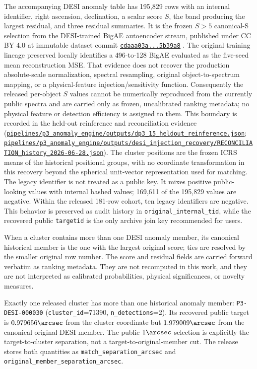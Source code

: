 \documentclass[twocolumn]{aastex701}
\newcommand{\repoBase}{https://github.com/Hubify-Projects/bigbounce/blob/main}
\newcommand{\artifact}[1]{\href{\repoBase/#1}{\nolinkurl{#1}}}
\begin{document}
The accompanying DESI anomaly table has 195,829 rows with an internal identifier, right
ascension, declination, a scalar score $S$, the band producing the largest residual, and three
residual summaries.  It is the frozen $S>5$ canonical-S selection from the DESI-trained BigAE
autoencoder stream, published under CC BY 4.0 at immutable dataset commit
\href{https://huggingface.co/datasets/bamfai/bigbounce-anomaly-catalog/tree/cdaaa03a72c69d86f011be128d93f261dc5b39a8}{\texttt{cdaaa03a...5b39a8}} \citep{Golden2026Data}.  The original
training lineage preserved locally identifies a 496-to-128 BigAE evaluated as the five-seed mean
reconstruction MSE.  That evidence does not recover the production absolute-scale normalization,
spectral resampling, original object-to-spectrum mapping, or a physical-feature injection/sensitivity
function.  Consequently the released per-object $S$ values cannot be numerically reproduced from
the currently public spectra and are carried only as frozen, uncalibrated ranking metadata; no
physical feature or detection efficiency is assigned to them.  This boundary is recorded in the
held-out reinference and reconciliation evidence
(\artifact{pipelines/p3\_anomaly\_engine/outputs/dp3\_15\_heldout\_reinference.json};
\artifact{pipelines/p3\_anomaly\_engine/outputs/desi\_injection\_recovery/RECONCILIATION\_history\_2026-06-28.json}).
The cluster positions are
the frozen ICRS means of the historical positional groups, with no coordinate transformation in
this recovery beyond the spherical unit-vector representation used for matching.  The legacy
identifier is not treated as a public key.  It mixes positive
public-looking values with internal hashed values; 169,611 of the 195,829 values are negative.
Within the released 181-row cohort, ten legacy identifiers are negative.  This behavior is
preserved as audit history in \texttt{original\_internal\_tid}, while the recovered public
\texttt{targetid} is the only archive join key recommended for users.

When a cluster contains more than one DESI anomaly member, its canonical historical member is
the one with the largest original score; ties are resolved by the smaller original row number.
The score and residual fields are carried forward verbatim as ranking metadata.  They are not
recomputed in this work, and they are not interpreted as calibrated probabilities, physical
significances, or novelty measures.

Exactly one released cluster has more than one historical anomaly member:
\texttt{P3-DESI-000030} (\texttt{cluster\_id}=71390, \texttt{n\_detections}=2).  Its recovered
public target is $0.979656\arcsec$ from the cluster coordinate but $1.979009\arcsec$ from the
canonical original DESI member.  The public $1\arcsec$ selection is explicitly the target-to-cluster
separation, not a target-to-original-member cut.  The release stores both quantities as
\texttt{match\_separation\_arcsec} and \texttt{original\_member\_separation\_arcsec}.
\end{document}
